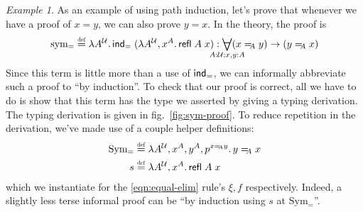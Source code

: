 \documentclass[11pt]{article} %
\theoremstyle{definition}
\theoremstyle{remark}
\newtheorem{example}{Example}
\begin{document}
\begin{example}\label{ex:propeq-symmetry}
As an example of using path induction, let's prove that whenever we have a proof of $x = y$, we can also prove $y = x$.
In the theory, the proof is
$$\mathrm{sym_=} \defeq \fun{A^\U}\ind_=\;(\fun{A^\U, x^A}\refl\;A\;x) : \All_{\mathclap{A:\U; x,y:A}} (x =_{\!\!A} y) \to (y =_{\!\!A} x)$$
Since this term is little more than a use of $\mathsf{ind}_=$, we can informally abbreviate such a proof to ``by induction''.
To check that our proof is correct, all we have to do is show that this term has the type we asserted by giving a typing derivation.
The typing derivation is given in fig.~\ref{fig:sym-proof}.
To reduce repetition in the derivation, we've made use of a couple helper definitions:
\begin{align*}
\mathrm{Sym_=} &\defeq \fun{A^\U, x^A,y^A,p^{x =_{\!\!A} y}}y =_{\!\!A} x \\
s &\defeq \fun{A^\U, x^A}\refl\;A\;x
\end{align*}
which we instantiate for the \ref{eqn:equal-elim} rule's $\xi, f$ respectively.
Indeed, a slightly less terse informal proof can be ``by induction using $s$ at $\mathrm{Sym_=}$''.


\end{example}
\end{document}
